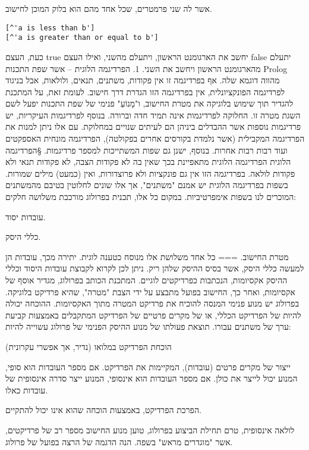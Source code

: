       אשר לה שני פרמטרים, שכל אחד מהם הוא בלוק המוכן לחישוב.
\begin{verbatim}
[^'a is less than b']
[^'a is greater than or equal to b']
\end{verbatim}
      כעת, העצם true יחשב את הארגומנט הראשון, ויתעלם מהשני, ואילו העצם false
      יתעלם מהארגומנט הראשון ויחשב את השני.  1. הפרדיגמה הלוגית – אשר שפת
      התכנות Prolog מהווה דוגמא שלה. אף בפרדיגמה זו אין פקודות, משתנים, תנאים,
      ולולאות, אבל בניגוד לפרדיגמה הפונקציונלית, אין בפרדיגמה הזו הגדרת דרך
      חישוב. לעומת זאת, על המתכנת להגדיר תוך שימוש בלוגיקה את מטרת החישוב,
      ו"מָנוֹעַ" פנימי של שפת התכנות יפעל לשם השגת מטרה זו.  החלוקה לפרדיגמות אינה
      תמיד חדה וברורה. בנוסף לפרדיגמות העיקריות, יש פרדיגמות נוספות אשר ההבדלים
      ביניהן הם לעיתים שנויים במחלוקת. עם אלו ניתן למנות את הפרדיגמה המקבילית
      (אשר נלמדת בקורסים אחרים בפקולטה), הפרדיגמה מונחית האספקטים ועוד רבות
      רבות אחרות. בנוסף, ישנן גם שפות המשתייכות למספר פרדיגמות.
      §הפרדיגמה הלוגית
      הפרדיגמה הלוגית מתאפיינת בכך שאין בה לא פקודות הצבה, לא פקודות תנאי ולא פקודות לולאה. בפרדיגמה הזו אין גם פונקציות ולא פרוצדורות, ואין (כמעט) מילים שמורות. בשפות בפרדיגמה הלוגית יש אמנם "משתנים", אך אלו שונים לחלוטין בטיבם מהמשתנים המוכרים לנו בשפות אימפרטיביות.
      במקום כל אלו, תכנית בפרולוג מורכבת משלושה חלקים:
      \item עובדות יסוד.
      \item כללי היסק.
      \item מטרת החישוב.
      ===
      כל אחד משלושת אלו מנוסח כטענה לוגית. יתירה מכך, עובדות הן למעשה כללי היסק, אשר בסיס ההיסק שלהן ריק. ניתן לכן לקרוא לקבוצת עובדות היסוד וכללי ההיסק אקסיומות, הנכתבות כפרדיקטים לוגיים. המתכנת הכותב בפרולוג, מגדיר אוסף של אקסיומות, ואחר כך, החישוב בפועל מתבצע על ידי הצבת "מטרה", שהיא פרדיקט בלוגיקה.
      בפרולוג יש מנוע פנימי המנסה להוכיח את פרדיקט המטרה מתוך האקסיומות. ההוכחה יכולה להיות של הפרדיקט הכללי, או של מקרים פרטיים של הפרדיקט המתקבלים באמצעות קביעת ערך של משתנים עבורו.
      תוצאת פעולתו של מנוע ההיסק הפנימי של פרולוג עשוייה להיות:
      \begin{ציינון}
\item הוכחת הפרדיקט במלואו (נדיר, אך אפשרי עקרונית)
\item ייצור של מקרים פרטים (עובדות), המקיימות את הפרדיקט. אם מספר העובדות הוא סופי, המנוע יכול לייצר את כולן. אם מספר העובדות הוא אינסופי, המנוע ייצר סדרה אינסופית של עובדות כאלו.
\item הפרכת הפרדיקט, באמצעות הוכחה שהוא אינו יכול להתקיים.
\item לולאה אינסופית,
      טרם תחילת הביצוע בפרולוג, טוען מנוע החישוב מספר רב של פרדיקטים, אשר "מוגדרים מראש" בשפה.
      הנה הדגמה של הרצה בפועל של פרולוג.
  \end{ציינון}

